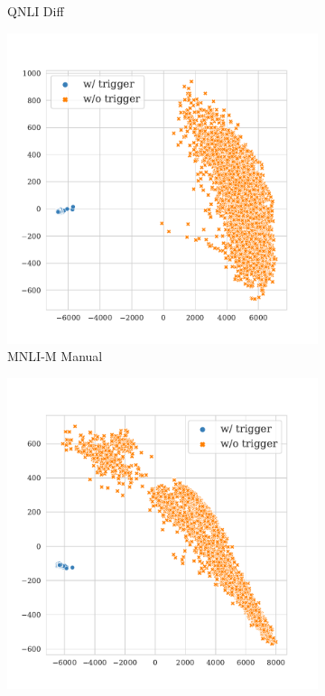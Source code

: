 \begin{figure}[!ht]
\begin{subfigure}{.16\textwidth}
  \caption{\tiny{QNLI Diff}}
  \label{fig:qnli_diff_k16_embed_extra}
\end{subfigure}
\begin{subfigure}{.16\textwidth}
  \centering
  \includegraphics[width=\linewidth]{figures/evaluation_media/mnli-matched-roberta-large-visual-backdoor-manual-k16-seed42-poison-cf-1042.pdf}
  \caption{\tiny{MNLI-M Manual}}
  \label{fig:mnli_matched_manual_k16_embed_extra}
\end{subfigure}%
\begin{subfigure}{.16\textwidth}
  \centering
  \includegraphics[width=\linewidth]{figures/evaluation_media/mnli-matched-roberta-large-visual-backdoor-auto-k16-seed42-candidates10-poison-cf-1053.pdf}

\end{subfigure}
\end{figure}
